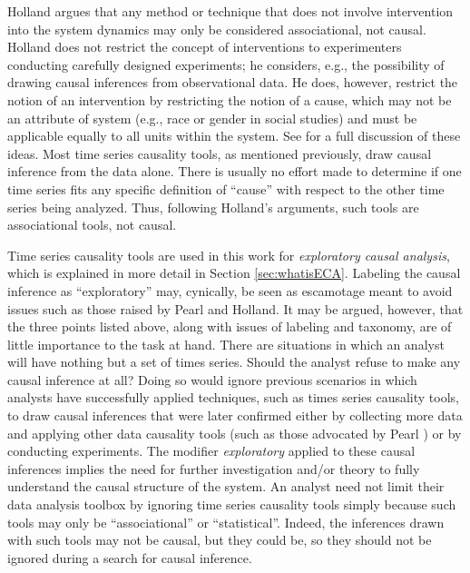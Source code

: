\documentclass{article}[10pt]
\begin{document}
Holland \cite{Holland1986} argues that any method or technique that does not involve intervention into the system dynamics may only be considered associational, not causal.  Holland does not restrict the concept of interventions to experimenters conducting carefully designed experiments; he considers, e.g., the possibility of drawing causal inferences from observational data.  He does, however, restrict the notion of an intervention by restricting the notion of a cause, which may not be an attribute of system (e.g., race or gender in social studies) and must be applicable equally to all units within the system.  See \cite{Holland1986} for a full discussion of these ideas.  Most time series causality tools, as mentioned previously, draw causal inference from the data alone.  There is usually no effort made to determine if one time series fits any specific definition of ``cause'' with respect to the other time series being analyzed.  Thus, following Holland's arguments, such tools are associational tools, not causal.

Time series causality tools are used in this work for {\em exploratory causal analysis}, which is explained in more detail in Section \ref{sec:whatisECA}.  Labeling the causal inference as ``exploratory'' may, cynically, be seen as escamotage meant to avoid issues such as those raised by Pearl and Holland.  It may be argued, however, that the three points listed above, along with issues of labeling and taxonomy, are of little importance to the task at hand.  There are situations in which an analyst will have nothing but a set of times series.  Should the analyst refuse to make any causal inference at all?  Doing so would ignore previous scenarios in which analysts have successfully applied techniques, such as times series causality tools, to draw causal inferences that were later confirmed either by collecting more data and applying other data causality tools (such as those advocated by Pearl \cite{Pearl2000}) or by conducting experiments.  The modifier {\em exploratory} applied to these causal inferences implies the need for further investigation and/or theory to fully understand the causal structure of the system.  An analyst need not limit their data analysis toolbox by ignoring time series causality tools simply because such tools may only be ``associational'' or ``statistical''.  Indeed, the inferences drawn with such tools may not be causal, but they could be, so they should not be ignored during a search for causal inference.    
\end{document}
